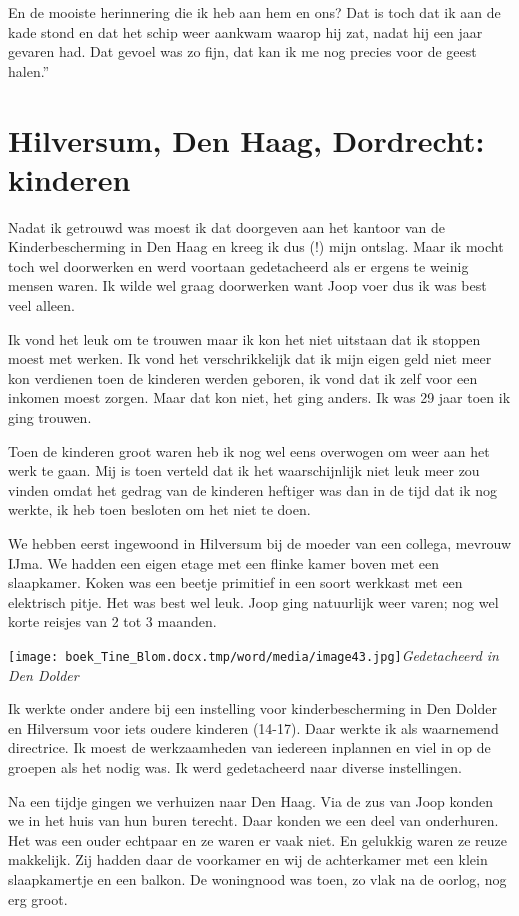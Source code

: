 \documentclass{scrbook}
\begin{document}
{En de mooiste herinnering die ik heb aan hem en ons? Dat is toch dat ik aan de kade stond en dat het schip weer aankwam waarop hij zat, nadat hij een jaar gevaren had. Dat gevoel was zo fijn, dat kan ik me nog precies voor de geest halen.''

\chapter{\label{ref-010}Hilversum, Den Haag, Dordrecht: kinderen}

Nadat ik getrouwd was moest ik dat doorgeven aan het kantoor van de Kinderbescherming in Den Haag en kreeg ik dus (!) mijn ontslag. Maar ik mocht toch wel doorwerken en werd voortaan gedetacheerd als er ergens te weinig mensen waren. Ik wilde wel graag doorwerken want Joop voer dus ik was best veel alleen.

Ik vond het leuk om te trouwen maar ik kon het niet uitstaan dat ik stoppen moest met werken. Ik vond het verschrikkelijk dat ik mijn eigen geld niet meer kon verdienen toen de kinderen werden geboren, ik vond dat ik zelf voor een inkomen moest zorgen. Maar dat kon niet, het ging anders. Ik was 29 jaar toen ik ging trouwen.\newline
 

Toen de kinderen groot waren heb ik nog wel eens overwogen om weer aan het werk te gaan. Mij is toen verteld dat ik het waarschijnlijk niet leuk meer zou vinden omdat het gedrag van de kinderen heftiger was dan in de tijd dat ik nog werkte, ik heb toen besloten om het niet te doen.

We hebben eerst ingewoond in Hilversum bij de moeder van een collega, mevrouw IJma. We hadden een eigen etage met een flinke kamer boven met een slaapkamer. Koken was een beetje primitief in een soort werkkast met een elektrisch pitje. Het was best wel leuk. Joop ging natuurlijk weer varen; nog wel korte reisjes van 2 tot 3 maanden. 

\texttt{[image: boek\_Tine\_Blom.docx.tmp/word/media/image43.jpg]}\textit{Gedetacheerd in Den Dolder }



 Ik werkte onder andere bij een instelling voor kinderbescherming in Den Dolder en Hilversum voor iets oudere kinderen (14-17). Daar werkte ik als waarnemend directrice. Ik moest de werkzaamheden van iedereen inplannen en viel in op de groepen als het nodig was. Ik werd gedetacheerd naar diverse instellingen.

Na een tijdje gingen we verhuizen naar Den Haag. Via de zus van Joop konden we in het huis van hun buren terecht. Daar konden we een deel van onderhuren. Het was een ouder echtpaar en ze waren er vaak niet. En gelukkig waren ze reuze makkelijk. Zij hadden daar de voorkamer en wij de achterkamer met een klein slaapkamertje en een balkon. De woningnood was toen, zo vlak na de oorlog, nog erg groot. 

}
\end{document}
